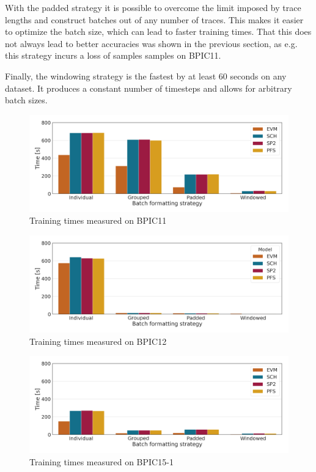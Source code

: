 With the padded strategy it is possible to overcome the limit imposed by trace lengths and construct batches out of any number of traces. This makes it easier to optimize the batch size, which can lead to faster training times. That this does not always lead to better accuracies was shown in the previous section, as e.g. this strategy incurs a loss of samples samples on BPIC11.

Finally, the windowing strategy is the fastest by at least 60 seconds on any dataset. It produces a constant number of timesteps and allows for arbitrary batch sizes.

\begin{figure}
    \centering
    \includegraphics[width=\textwidth]{gfx/bpic2011/train_timings.png}
    \caption{Training times measured on BPIC11}
    \label{fig:BPIC11-training-timings}
\end{figure}
\begin{figure}
    \centering
    \includegraphics[width=\textwidth]{gfx/bpic2012/train_timings.png}
    \caption{Training times measured on BPIC12}
    \label{fig:BPIC12-training-timings}
\end{figure}
\begin{figure}
    \centering
    \includegraphics[width=\textwidth]{gfx/bpic2015_1/train_timings.png}
    \caption{Training times measured on BPIC15-1}
    \label{fig:BPIC15-1-training-timings}
\end{figure}
